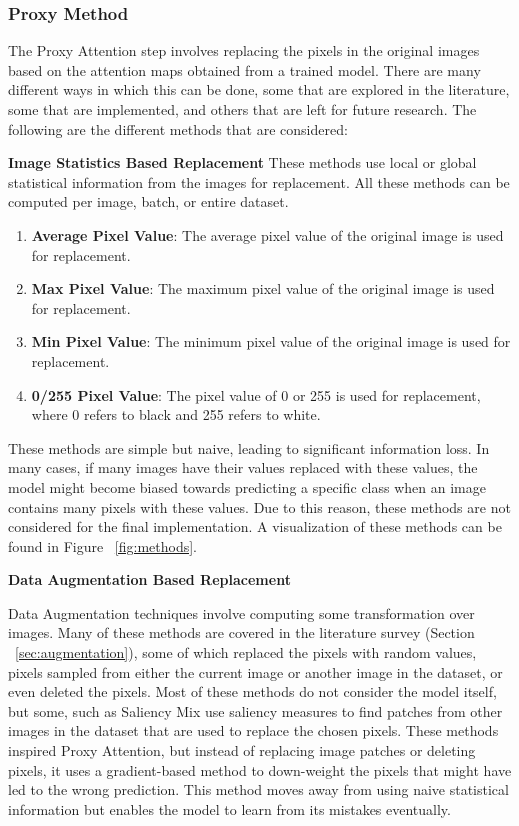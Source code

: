 \documentclass[a4paper,11pt,openright]{book}
\begin{document}
\subsubsection{Proxy Method}
The Proxy Attention step involves replacing the pixels in the original images based on the attention maps obtained from a trained model. There are many different ways in which this can be done, some that are explored in the literature, some that are implemented, and others that are left for future research. The following are the different methods that are considered:

\textbf{Image Statistics Based Replacement}
These methods use local or global statistical information from the images for replacement. All these methods can be computed per image, batch, or entire dataset.

\begin{enumerate}
    \item \textbf{Average Pixel Value}: The average pixel value of the original image is used for replacement.
    \item \textbf{Max Pixel Value}: The maximum pixel value of the original image is used for replacement.
    \item \textbf{Min Pixel Value}: The minimum pixel value of the original image is used for replacement.
    \item \textbf{0/255 Pixel Value}: The pixel value of 0 or 255 is used for replacement, where 0 refers to black and 255 refers to white.
\end{enumerate}
These methods are simple but naive, leading to significant information loss. In many cases, if many images have their values replaced with these values, the model might become biased towards predicting a specific class when an image contains many pixels with these values.
Due to this reason, these methods are not considered for the final implementation. A visualization of these methods can be found in Figure ~\ref{fig:methods}.

\textbf{Data Augmentation Based Replacement}

Data Augmentation techniques involve computing some transformation over images. Many of these methods are covered in the literature survey (Section ~\ref{sec:augmentation}), some of which replaced the pixels with random values, pixels sampled from either the current image or another image in the dataset, or even deleted the pixels. Most of these methods do not consider the model itself, but some, such as Saliency Mix \cite{uddinSaliencyMixSaliencyGuided2021} use saliency measures to find patches from other images in the dataset that are used to replace the chosen pixels.
These methods inspired Proxy Attention, but instead of replacing image patches or deleting pixels, it uses a gradient-based method to down-weight the pixels that might have led to the wrong prediction. This method moves away from using naive statistical information but enables the model to learn from its mistakes eventually.
\end{document}
